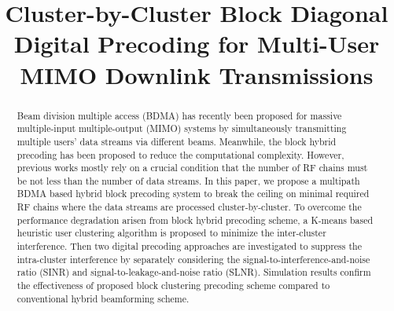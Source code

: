 \documentclass[conference]{IEEEtran}
\begin{document}
\title{Cluster-by-Cluster Block Diagonal Digital Precoding for Multi-User MIMO Downlink Transmissions}
\author{}
\maketitle\thispagestyle{plain}\pagestyle{plain}

\begin{abstract}
Beam division multiple access (BDMA) has recently been proposed for massive multiple-input multiple-output (MIMO) systems by simultaneously transmitting multiple users' data streams via different beams. Meanwhile, the block hybrid precoding has been proposed to reduce the computational complexity. However, previous works mostly rely on a crucial condition that the number of RF chains must be not less than the number of data streams. In this paper, we propose a multipath BDMA based hybrid block precoding system to break the ceiling on minimal required RF chains where the data streams are processed cluster-by-cluster. To overcome the performance degradation arisen from block hybrid precoding scheme, a K-means based heuristic user clustering algorithm is proposed to minimize the inter-cluster interference. Then two digital precoding approaches are investigated to suppress the intra-cluster interference by separately considering the signal-to-interference-and-noise ratio (SINR) and signal-to-leakage-and-noise ratio (SLNR). Simulation results confirm the effectiveness of proposed block clustering precoding scheme compared to conventional hybrid beamforming scheme.
\end{abstract}
\end{document}
